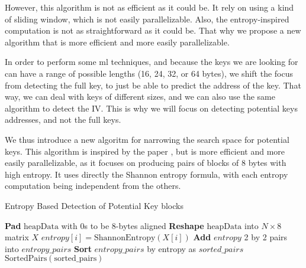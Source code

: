     However, this algorithm is not as efficient as it could be. It rely on using a kind of sliding window, which is not easily parallelizable. Also, the entropy-inspired computation is not as straightforward as it could be. That why we propose a new algorithm that is more efficient and more easily parallelizable.

    In order to perform some \acrshort{ml} techniques, and because the keys we are looking for can have a range of possible lengths (16, 24, 32, or 64 bytes), we shift the focus from detecting the full key, to just be able to predict the address of the key. That way, we can deal with keys of different sizes, and we can also use the same algorithm to detect the IV. This is why we will focus on detecting potential keys addresses, and not the full keys.

    We thus introduce a new algoritm for narrowing the search space for potential keys. This algorithm is inspired by the paper , but is more efficient and more easily parallelizable, as it focuses on producing pairs of blocks of 8 bytes with high entropy. It uses directly the Shannon entropy formula, with each entropy computation being independent from the others.

    \begin{algorithm}
        \caption{Entropy Based Detection of Potential Key blocks}
        \begin{algorithmic}[1]
            \State \textbf{Pad} $\text{heapData}$ with 0s to be 8-bytes aligned
            \State \textbf{Reshape} $\text{heapData}$ into $N \times 8$ matrix $X$
                \State $entropy[i] = \text{ShannonEntropy}(X[i])$ 
            \EndFor
            \State \textbf{Add} $entropy$ 2 by 2 pairs into $entropy\_pairs$ 
            \State \textbf{Sort} $entropy\_pairs$ by entropy as $sorted\_pairs$
            \State \Return $\text{SortedPairs}(\text{sorted\_pairs})$
        \EndProcedure
        \end{algorithmic}
    \end{algorithm}


